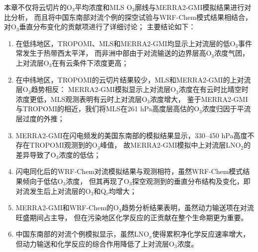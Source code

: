 本章不仅将云切片的O$_3$平均浓度和MLS O$_3$廓线与MERRA2-GMI模拟结果进行对比分析，
而且将中国东南部对流个例的探空试验与WRF-Chem模式结果相结合，对O$_3$垂直分布变化的贡献项进行了详细讨论；
主要结论如下：

\begin{enumerate}[label=(\arabic*), labelindent=\parindent, leftmargin=0pt, widest=0, itemindent=*, topsep=0pt, partopsep=0pt, parsep=0pt]

\item 在低纬地区，TROPOMI、MLS和MERRA2-GMI均显示上对流层的低O$_3$事件常发生于热带西太平洋，
而非洲中部由于对流输送的边界层高O$_3$浓度气团，上对流层O$_3$在有云条件下浓度更高；

\item 在中纬地区，TROPOMI的云切片结果较少，MLS和MERRA2-GMI的上对流层O$_3$趋势相反：
MERRA2-GMI模拟显示上对流层O$_3$浓度在有云时比晴空时浓度更低，MLS观测表明有云时上对流层O$_3$浓度增大，
鉴于MERRA2-GMI与TROPOMI的相近，我们将MLS在261 hPa高度层高估的O$_3$浓度归因于平流层过度的外推；

\item MERRA2-GMI在闪电频发的美国东南部的模拟结果显示，330--450 hPa高度不存在TROPOMI观测到的O$_3$峰值，
故MERRA2-GMI模拟中上对流层LNO$_2$的差异导致了O$_3$浓度的低估；

\item 闪电同化后的WRF-Chem对流模拟结果与观测相符，虽然WRF-Chem模式结果倾向于低估O$_3$浓度，
但其再现了O$_3$探空观测到的垂直分布结构及变化，即对流发生后上对流层的O$_3$和Q$_v$均增大；

\item MERRA2-GMI和WRF-Chem的O$_3$趋势分析结果表明，虽然动力输送项在对流旺盛期间占主导，
但在污染地区化学反应的正贡献在整个生命期更为重要。

\item 中国东南部的对流个例模拟显示，虽然LNO$_x$使得累积净化学反应速率增大，
但动力输送和化学反应的综合作用降低了上对流层O$_3$浓度。

\end{enumerate}
